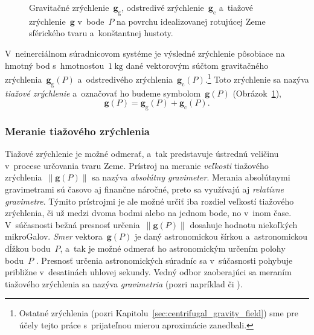 \documentclass[a4paper, 12pt]{book}
\newcommand{\gidx}{\mathrm g}
\newcommand{\cidx}{\mathrm c}
\let\vec\mathbf
\begin{document}
\begin{figure}
\centering

\caption{Gravitačné zrýchlenie~$\vec g_\gidx$, odstredivé zrýchlenie~$\vec 
g_\cidx$ a~tiažové zrýchlenie~$\vec g$ v~bode~$P$ na povrchu idealizovanej 
rotujúcej Zeme sférického tvaru a~konštantnej hustoty.}
\label{fig:gravity_vector}
\end{figure}

V~neinerciálnom súradnicovom systéme je výsledné zrýchlenie pôsobiace na hmotný 
bod s~hmotnosťou~$1 \ \mathrm{kg}$ dané vektorovým súčtom gravitačného 
zrýchlenia~$\vec g_\gidx(P)$ a~odstredivého zrýchlenia~$\vec 
g_\cidx(P)$.\footnote{Ostatné zrýchlenia (pozri 
Kapitolu~\ref{sec:centrifugal_gravity_field}) sme pre účely tejto práce 
s~prijateľnou mierou aproximácie zanedbali.}  Toto zrýchlenie sa nazýva 
\emph{tiažové zrýchlenie} a~označovať ho budeme symbolom~$\vec g(P)$ 
(Obrázok~\ref{fig:gravity_vector}),
%
\begin{equation}
\label{eq:g}
\vec g(P) = \vec g_\gidx(P) + \vec g_\cidx(P){.}
\end{equation}


\subsubsection{Meranie tiažového zrýchlenia}
\label{sec:gravity_measurements}

Tiažové zrýchlenie je možné odmerať, a~tak predstavuje ústrednú veličinu 
v~procese určovania tvaru Zeme.  Prístroj na meranie \emph{veľkosti} tiažového 
zrýchlenia~$\| \vec g(P) \|$ sa nazýva \emph{absolútny gravimeter}.  Merania 
absolútnymi gravimetrami sú časovo aj finančne náročné, preto sa využívajú aj 
\emph{relatívne gravimetre}.  Týmito prístrojmi je ale možné určiť iba rozdiel 
veľkostí tiažového zrýchlenia, či už medzi dvoma bodmi alebo na jednom bode, no 
v~inom čase.  V~súčasnosti bežná presnosť určenia~$\| \vec g(P) \|$ dosahuje 
hodnotu niekoľkých mikroGalov.  \emph{Smer} vektora~$\vec g(P)$ je daný 
astronomickou šírkou a~astronomickou dĺžkou bodu~$P$, a~tak je možné odmerať ho 
astronomickým určením polohy bodu~$P$ \parencite{MoritzPhysicalGeodesy}.  
Presnosť určenia astronomických súradníc sa v~súčasnosti pohybuje približne 
v~desatinách uhlovej sekundy.    Vedný odbor zaoberajúci sa meraním tiažového 
zrýchlenia sa nazýva \emph{gravimetria} (pozri napríklad 
\cite{Torge1989,Rozimant1994} či \cite{Janak2010}).  
\end{document}
